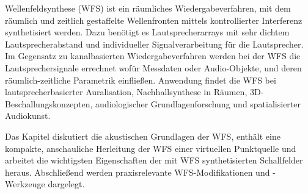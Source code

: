 
%
Wellenfeldsynthese (WFS) ist ein räumliches Wiedergabeverfahren, mit dem
räumlich und zeitlich gestaffelte Wellenfronten mittels kontrollierter
Interferenz synthetisiert werden.
%
Dazu benötigt es Lautsprecherarrays mit sehr dichtem Lautsprecherabstand und
individueller Signalverarbeitung für die Lautsprecher.
%
Im Gegensatz zu kanalbasierten Wiedergabeverfahren werden bei der WFS die
Lautsprechersignale errechnet wofür Messdaten oder Audio-Objekte, und deren
räumlich-zeitliche Parametrik einfließen.
%
Anwendung findet die WFS bei lautsprecherbasierter Auralisation,
Nachhallsynthese in Räumen, 3D-Beschallungskonzepten,
audiologischer Grundlagenforschung und
spatialisierter Audiokunst.
%

Das Kapitel diskutiert die akustischen Grundlagen der WFS, enthält eine
kompakte, anschauliche Herleitung der WFS einer virtuellen Punktquelle und
arbeitet die wichtigsten Eigenschaften der mit WFS synthetisierten Schallfelder
heraus.
%
Abschließend werden praxisrelevante WFS-Modifikationen und -Werkzeuge dargelegt.
